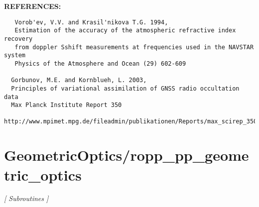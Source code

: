 \textbf{REFERENCES:}\hspace{0.08in}\begin{Verbatim}
   Vorob'ev, V.V. and Krasil'nikova T.G. 1994, 
   Estimation of the accuracy of the atmospheric refractive index recovery
   from doppler Sshift measurements at frequencies used in the NAVSTAR system
   Physics of the Atmosphere and Ocean (29) 602-609

  Gorbunov, M.E. and Kornblueh, L. 2003,
  Principles of variational assimilation of GNSS radio occultation data
  Max Planck Institute Report 350 
  http://www.mpimet.mpg.de/fileadmin/publikationen/Reports/max_scirep_350.pdf
\end{Verbatim}
\section{GeometricOptics/ropp\_pp\_geometric\_optics}
\textsl{[ Subroutines ]}

